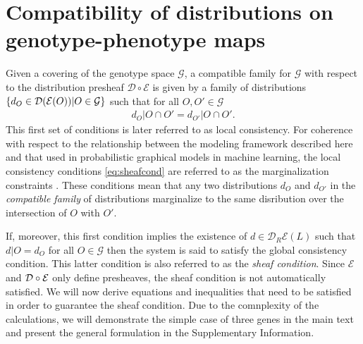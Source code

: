\section{Compatibility of distributions on genotype-phenotype maps}\label{sec:compatibilityofgpms}
Given a covering of the genotype space $\mathcal{G}$, a compatible family for $\mathcal{G}$ with respect to the distribution presheaf $\mathcal{D} \circ \mathcal{E}$ is given by a family of distributions $\{d_O \in \mathcal{D} (\mathcal{E}(O)) | O \in \mathcal{G}\}$ such that for all $O, O' \in \mathcal{G}$
\begin{eqnarray}\label{eq:sheafcond}
d_O|O \cap O' = d_{O'}|O \cap O'.
\end{eqnarray}
This first set of conditions is later referred to as local consistency. For coherence with respect to the relationship between the modeling framework described here and that used in probabilistic graphical models in machine learning, the local consistency conditions \ref{eq:sheafcond} are referred to as the marginalization constraints \cite{Wainwright2007}.  These conditions mean that any two distributions $d_O$ and $d_{O'}$ in the \emph{compatible family} of distributions marginalize to the same disribution over the intersection of $O$ with $O'$.

If, moreover, this first condition implies the existence of $d \in \mathcal{D}_R \mathcal{E}(L)$ such that $d|O = d_O$ for all $O \in \mathcal{G}$ then the system is said to satisfy the global consistency condition.  This latter condition is also referred to as the \emph{sheaf condition}.  Since $\mathcal{E}$ and $\mathcal{D} \circ \mathcal{E}$ only define presheaves, the sheaf condition is not automatically satisfied.  We will now derive equations and inequalities that need to be satisfied in order to guarantee the sheaf condition.  Due to the comnplexity of the calculations, we will demonstrate the simple case of three genes in the main text and present the general formulation in the Supplementary Information.


